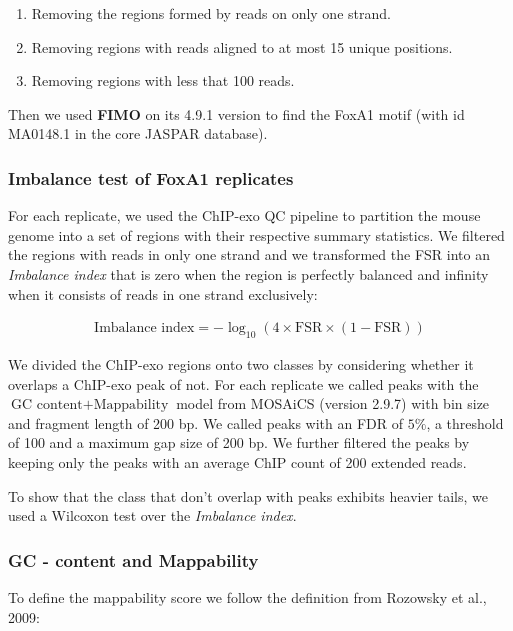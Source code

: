\documentclass{bmcart}\usepackage[]{graphicx}\usepackage[]{color}
\begin{document}
\begin{enumerate}
\item Removing the regions formed by reads on only one strand.
\item Removing regions with reads aligned to at most 15 unique
  positions.
\item Removing regions with less that 100 reads.
\end{enumerate}

Then we used \textbf{FIMO} on its 4.9.1 version \cite{fimo} to find
the FoxA1 motif (with id MA0148.1 in the core JASPAR database).

\subsubsection*{Imbalance test of FoxA1 replicates}

For each replicate, we used the ChIP-exo QC pipeline to partition the
mouse genome into a set of regions with their respective summary
statistics. We filtered the regions with reads in only one strand and
we transformed the FSR into an \emph{Imbalance index} that is zero
when the region is perfectly balanced and infinity when it consists of
reads in one strand exclusively:

\begin{align*}
  \mbox{Imbalance index} = -\log_{10} (4 \times \mbox{FSR} \times (1 -
  \mbox{FSR}))
\end{align*}

We divided the ChIP-exo regions onto two classes by considering
whether it overlaps a ChIP-exo peak of not. For each replicate we
called peaks with the $\mbox{GC content} + \mbox{Mappability}$ model
from MOSAiCS \cite{mosaics} (version 2.9.7) with bin size and fragment
length of 200 bp. We called peaks with an FDR of $5\%$, a threshold of
100 and a maximum gap size of 200 bp. We further filtered the peaks by
keeping only the peaks with an average ChIP count of 200 extended
reads.

To show that the class that don't overlap with peaks exhibits heavier
tails, we used a Wilcoxon test over the \emph{Imbalance index}.

\subsubsection*{GC - content and Mappability}

To define the mappability score we follow the definition from Rozowsky
et al., 2009:
\end{document}
